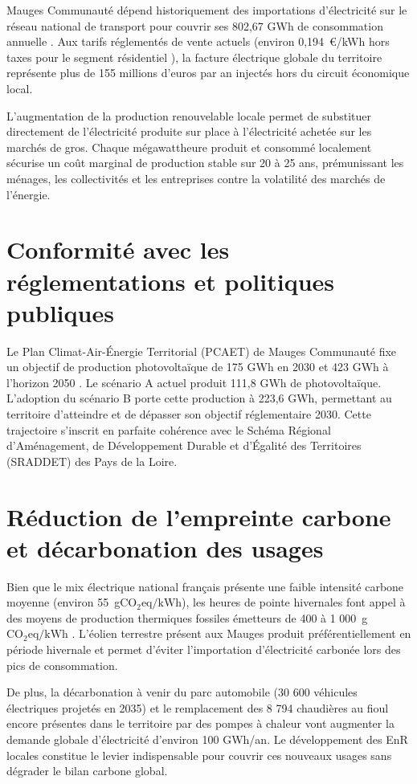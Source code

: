 \documentclass[12pt, a4paper]{report}
\begin{document}
Mauges Communauté dépend historiquement des importations d'électricité sur le réseau national de transport pour couvrir ses 802,67 GWh de consommation annuelle \cite{odre_conso}. Aux tarifs réglementés de vente actuels (environ 0,194~\euro/kWh hors taxes pour le segment résidentiel \cite{cre_trve}), la facture électrique globale du territoire représente plus de 155 millions d'euros par an injectés hors du circuit économique local.

L'augmentation de la production renouvelable locale permet de substituer directement de l'électricité produite sur place à l'électricité achetée sur les marchés de gros. Chaque mégawattheure produit et consommé localement sécurise un coût marginal de production stable sur 20 à 25 ans, prémunissant les ménages, les collectivités et les entreprises contre la volatilité des marchés de l'énergie.

\section{Conformité avec les réglementations et politiques publiques}

Le Plan Climat-Air-Énergie Territorial (PCAET) de Mauges Communauté fixe un objectif de production photovoltaïque de 175 GWh en 2030 et 423 GWh à l'horizon 2050 \cite{pcaet_mauges}. Le scénario A actuel produit 111,8 GWh de photovoltaïque. L'adoption du scénario B porte cette production à 223,6 GWh, permettant au territoire d'atteindre et de dépasser son objectif réglementaire 2030. Cette trajectoire s'inscrit en parfaite cohérence avec le Schéma Régional d'Aménagement, de Développement Durable et d'Égalité des Territoires (SRADDET) des Pays de la Loire.

\section{Réduction de l'empreinte carbone et décarbonation des usages}

Bien que le mix électrique national français présente une faible intensité carbone moyenne (environ 55~g$\text{CO}_2\text{eq}/\text{kWh}$), les heures de pointe hivernales font appel à des moyens de production thermiques fossiles émetteurs de 400 à 1 000~g$\text{CO}_2\text{eq}/\text{kWh}$ \cite{rte_eco2mix}. L'éolien terrestre présent aux Mauges produit préférentiellement en période hivernale et permet d'éviter l'importation d'électricité carbonée lors des pics de consommation.

De plus, la décarbonation à venir du parc automobile (30 600 véhicules électriques projetés en 2035) et le remplacement des 8 794 chaudières au fioul encore présentes dans le territoire par des pompes à chaleur \cite{insee_rp} vont augmenter la demande globale d'électricité d'environ 100 GWh/an. Le développement des EnR locales constitue le levier indispensable pour couvrir ces nouveaux usages sans dégrader le bilan carbone global.
\end{document}
